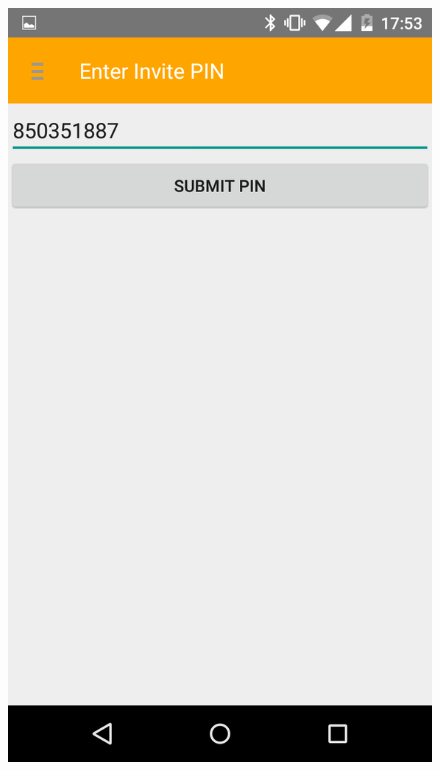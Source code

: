\begin{figure}
\centering
\begin{minipage}{.4\textwidth}
  \centering
  \includegraphics[width=.8\linewidth]{abb/bsp/bsp15}
  \label{fig:bsp15}
\end{minipage}
\begin{minipage}{.4\textwidth}
  \centering

\end{minipage}
\end{figure}
